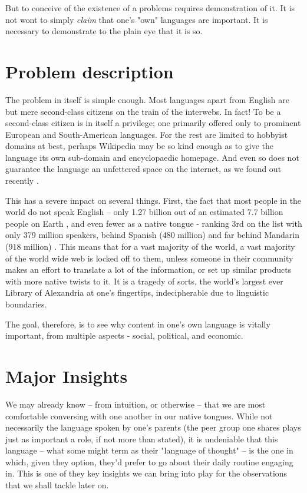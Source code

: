 \documentclass[11pt]{article}
\begin{document}
But to conceive of the existence of a problems requires demonstration of it. It
is not wont to simply \textit{claim} that one's "own" languages are important.
It is necessary to demonstrate to the plain eye that it is so.

\section{Problem description}

The problem in itself is simple enough. Most languages apart from English are
but mere second-class citizens on the train of the interwebs. In fact! To be a
second-class citizen is in itself a privilege; one primarily offered only to
prominent European and South-American languages. For the rest are limited to
hobbyist domains at best, perhaps Wikipedia may be so kind enough as to give the
language its own sub-domain and encyclopaedic homepage. And even so does not
guarantee the language an unfettered space on the internet, as we found out
recently \cite{canales_for_2020}. 

This has a severe impact on several things. First, the fact that most people in
the world do not speak English -- only 1.27 billion out of an estimated 7.7
billion people on Earth \cite{ethnologue_english_2019}, and even fewer as a
native tongue - ranking 3rd on the list with only 379 million speakers, behind
Spanish (480 million) and far behind Mandarin (918 million)
\cite{ethnologue_what_2019}. This means that for a vast majority of the world, a
vast majority of the world wide web is locked off to them, unless someone in
their community makes an effort to translate a lot of the information, or set up
similar products with more native twists to it. It is a tragedy of sorts, the
world's largest ever Library of Alexandria at one's fingertips, indecipherable
due to linguistic boundaries.

The goal, therefore, is to see why content in one's own language is vitally
important, from multiple aspects - social, political, and economic.

\section{Major Insights}

We may already know -- from intuition, or otherwise -- that we are most
comfortable conversing with one another in our native tongues. While not
necessarily the language spoken by one's parents (the peer group one shares
plays just as important a role, if not more than stated), it is undeniable that
this language -- what some might term as their "language of thought" -- is the
one in which, given they option, they'd prefer to go about their daily routine
engaging in. This is one of they key insights we can bring into play for the
observations that we shall tackle later on.
\end{document}
